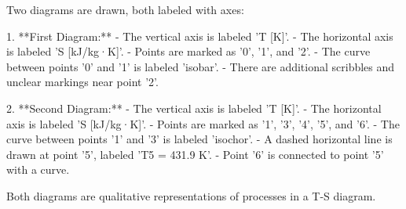 Two diagrams are drawn, both labeled with axes:  

1. **First Diagram:**  
   - The vertical axis is labeled 'T [K]'.  
   - The horizontal axis is labeled 'S [kJ/kg·K]'.  
   - Points are marked as '0', '1', and '2'.  
   - The curve between points '0' and '1' is labeled 'isobar'.  
   - There are additional scribbles and unclear markings near point '2'.  

2. **Second Diagram:**  
   - The vertical axis is labeled 'T [K]'.  
   - The horizontal axis is labeled 'S [kJ/kg·K]'.  
   - Points are marked as '1', '3', '4', '5', and '6'.  
   - The curve between points '1' and '3' is labeled 'isochor'.  
   - A dashed horizontal line is drawn at point '5', labeled 'T5 = 431.9 K'.  
   - Point '6' is connected to point '5' with a curve.  

Both diagrams are qualitative representations of processes in a T-S diagram.